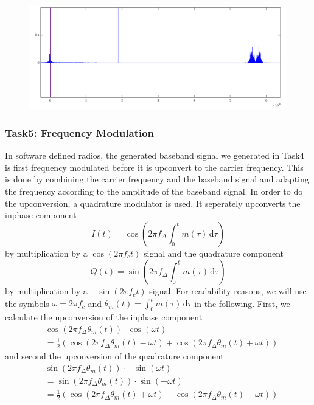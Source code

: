 \documentclass[sigconf]{acmart}
\begin{document}
\begin{figure}[tb!]
	\includegraphics[width=1\linewidth]{baseband_spectrum2.png}
	\caption{}
	\label{fig:rds_filt_plot}
\end{figure}

\hypertarget{Task5:ux20Frequencyux20Modulation}{%
\subsubsection{Task5: Frequency
Modulation}\label{Task5:ux20Frequencyux20Modulation}}
In software defined radios, the generated baseband signal we generated in Task4 is first frequency
modulated before it is upconvert to the carrier frequency. This is done by combining the carrier frequency
and the baseband signal and adapting the frequency according to the amplitude of the baseband signal.
In order to do the upconversion, a quadrature modulator is used. It seperately upconverts the inphase component
\[
I(t) = \cos (2 \pi f_\Delta \int_0^t m(\tau)\,\mathrm{d}\tau)
\]
by multiplication by a \( \cos(2 \pi f_c t) \) signal and the quadrature component
\[
Q(t) = \sin (2 \pi f_\Delta \int_0^t m(\tau)\,\mathrm{d}\tau)
\]
by multiplication by a \( -\sin(2 \pi f_c t) \)  signal. For readability reasons, we will
use the symbols \( \omega = 2 \pi f_c \) and \( \theta_m (t) = \int_0^t m(\tau)\,\mathrm{d}\tau \)
in the following. First, we calculate the upconversion of the inphase component
\begin{align*}
&\cos (2 \pi f_\Delta \theta_m (t)) \cdot \cos(\omega t)\\
&= \frac{1}{2}(\cos (2 \pi f_\Delta \theta_m (t) - \omega t) + \cos (2 \pi f_\Delta \theta_m (t) + \omega t))
\end{align*}
and second the upconversion of the quadrature component
\begin{align*}
&\sin (2 \pi f_\Delta \theta_m (t)) \cdot -\sin(\omega t)\\
&= \sin (2 \pi f_\Delta \theta_m (t)) \cdot \sin(-\omega t)\\
&= \frac{1}{2}(\cos (2 \pi f_\Delta \theta_m (t) + \omega t) - \cos (2 \pi f_\Delta \theta_m (t) - \omega t))
\end{align*}
\end{document}
